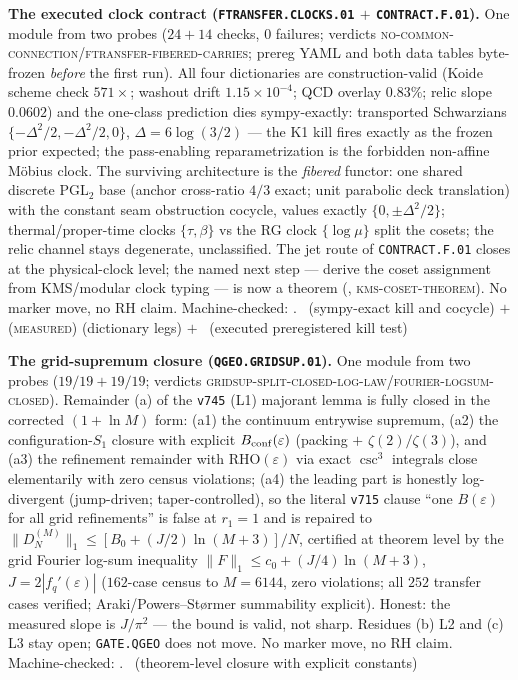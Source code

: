 \documentclass[11pt,a4paper]{article}
\theoremstyle{definition}
\begin{document}
\par\smallskip\noindent\textbf{The executed clock contract
(\texttt{FTRANSFER.CLOCKS.01} $+$ \texttt{CONTRACT.F.01}).}
One module from two probes ($24+14$ checks, $0$ failures; verdicts
\textsc{no-common-connection}/\textsc{ftransfer-fibered-carries};
prereg YAML and both data tables byte-frozen \emph{before} the
first run).  All four dictionaries are construction-valid (Koide
scheme check $571\times$; washout drift $1.15\times10^{-4}$; QCD
overlay $0.83\%$; relic slope $0.0602$) and the one-class
prediction dies sympy-exactly: transported Schwarzians
$\{-\Delta^2/2,-\Delta^2/2,0\}$, $\Delta=6\log(3/2)$ --- the K1
kill fires exactly as the frozen prior expected; the pass-enabling
reparametrization is the forbidden non-affine M\"obius clock.  The
surviving architecture is the \emph{fibered} functor: one shared
discrete PGL$_2$ base (anchor cross-ratio $4/3$ exact; unit
parabolic deck translation) with the constant seam obstruction
cocycle, values exactly $\{0,\pm\Delta^2/2\}$; thermal/proper-time
clocks $\{\tau,\beta\}$ vs the RG clock $\{\log\mu\}$ split the
cosets; the relic channel stays degenerate, unclassified.  The jet
route of \texttt{CONTRACT.F.01} closes at the physical-clock
level; the named next step --- derive the coset assignment from
KMS/modular clock typing --- is now a theorem
(,
\textsc{kms-coset-theorem}).  No marker move, no RH claim.
Machine-checked: .
\mE\ (sympy-exact kill and cocycle) $+$ (\textsc{measured})
(dictionary legs) $+$ \mX\ (executed preregistered kill test)
\par\smallskip

\par\smallskip\noindent\textbf{The grid-supremum closure
(\texttt{QGEO.GRIDSUP.01}).}
One module from two probes ($19/19+19/19$; verdicts
\textsc{gridsup-split-closed-log-law}/\textsc{fourier-logsum-closed}).
Remainder (a) of the \texttt{v745} (L1) majorant lemma is fully
closed in the corrected $(1+\ln M)$ form: (a1) the continuum
entrywise supremum, (a2) the configuration-$S_1$ closure with
explicit $B_{\rm conf}(\varepsilon)$ (packing $+$
$\zeta(2)/\zeta(3)$), and (a3) the refinement remainder with
$\mathrm{RHO}(\varepsilon)$ via exact $\csc^3$ integrals close
elementarily with zero census violations; (a4) the leading part is
honestly log-divergent (jump-driven; taper-controlled), so the
literal \texttt{v715} clause ``one $B(\varepsilon)$ for all grid
refinements'' is false at $r_1=1$ and is repaired to
$\|D_N^{(M)}\|_1\le[B_0+(J/2)\ln(M{+}3)]/N$, certified at theorem
level by the grid Fourier log-sum inequality
$\|F\|_1\le c_0+(J/4)\ln(M{+}3)$, $J=2|f_q'(\varepsilon)|$
($162$-case census to $M=6144$, zero violations; all $252$
transfer cases verified; Araki/Powers--St\o rmer summability
explicit).  Honest: the measured slope is $J/\pi^2$ --- the bound
is valid, not sharp.  Residues (b) L2 and (c) L3 stay open;
\texttt{GATE.QGEO} does not move.  No marker move, no RH claim.
Machine-checked: .
\mE\ (theorem-level closure with explicit constants)
\par\smallskip
\end{document}
